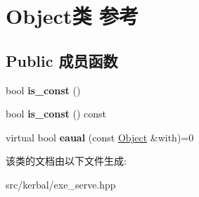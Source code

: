 \hypertarget{class_object}{}\section{Object类 参考}
\label{class_object}
\subsection*{Public 成员函数}
\begin{DoxyCompactItemize}
\item 
\mbox{\label{class_object_a88b433377d43073867c64497f8f80301}} 
bool {\bfseries is\+\_\+const} ()
\item 
\mbox{\label{class_object_a427f18e0615047a54d9c66d95f3b4802}} 
bool {\bfseries is\+\_\+const} () const
\item 
\mbox{\label{class_object_a0244c5a18927a99472b8d5b8e69b416e}} 
virtual bool {\bfseries eaual} (const \hyperlink{class_object}{Object} \&with)=0
\end{DoxyCompactItemize}


该类的文档由以下文件生成\+:\begin{DoxyCompactItemize}
\item 
src/kerbal/exe\+\_\+serve.\+hpp\end{DoxyCompactItemize}
